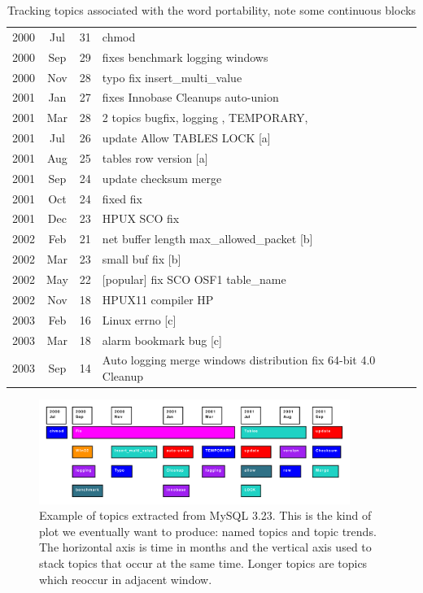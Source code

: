 \documentclass[times, 10pt,twocolumn]{article}
\begin{document}
\begin{table}
\centering
\begin{tabular}{|ccc|l|}
\hline
2000 &  Jul &  31 &    chmod \\
2000 &  Sep &  29 &    fixes benchmark logging windows \\
2000 &  Nov &  28 &    typo fix insert\_multi\_value \\
2001 &  Jan &  27 &    fixes Innobase Cleanups auto-union \\
2001 &  Mar &  28 &    2 topics bugfix, logging , TEMPORARY,  \\
\hline
2001 &  Jul &  26 &    update Allow TABLES LOCK [a] \\ 

2001 &  Aug &  25 &    tables row version [a] \\
\hline
2001 &  Sep &  24 &    update checksum merge \\
2001 &  Oct &  24 &    fixed fix \\
2001 &  Dec &  23 &    HPUX SCO fix \\
\hline
2002 &  Feb &  21 &    net buffer length  max\_allowed\_packet [b] \\
2002 &  Mar &  23 &    small buf fix [b]  \\
\hline
2002 &  May &  22 &    [popular] fix SCO OSF1 table\_name \\
2002 &  Nov &  18 &    HPUX11 compiler HP \\
\hline
2003 &  Feb &  16 &    Linux errno  [c] \\
2003 &  Mar &  18 &    alarm bookmark bug [c] \\
\hline
2003 &  Sep &  14 &    Auto logging merge windows distribution fix 64-bit 4.0 Cleanup \\
\hline
\end{tabular}
\caption{Tracking topics associated with the word portability, note some continuous blocks}
\label{tab:portability}
\end{table}

\begin{figure}
  \centering
  \includegraphics[width=0.9\textwidth]{lda}
  \caption{Example of topics extracted from MySQL 3.23. This is the kind of plot we eventually want to produce: named topics and topic trends. The horizontal axis is time in months and the vertical axis used to stack topics that occur at the same time. Longer topics are topics which reoccur in adjacent window.}
  \label{fig:lda}
\end{figure}
\end{document}
